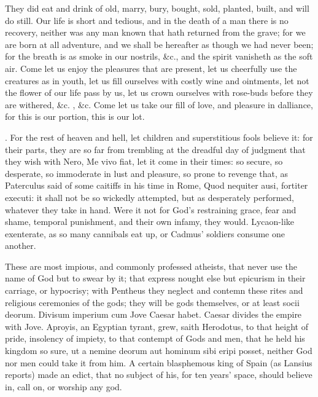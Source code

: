 {They did eat and drink of old, marry, bury, bought, sold,
planted, built, and will do still. Our life is short and tedious,
and in the death of a man there is no recovery, neither was any man
known that hath returned from the grave; for we are born at all
adventure, and we shall be hereafter as though we had never been; for
the breath is as smoke in our nostrils, \&c., and the spirit vanisheth
as the soft air. Come let us enjoy the pleasures that are
present, let us cheerfully use the creatures as in youth, let us fill
ourselves with costly wine and ointments, let not the flower of our
life pass by us, let us crown ourselves with rose-buds before they are
withered, \&c. , \&c.  Come let
us take our fill of love, and pleasure in dalliance, for this is our
portion, this is our lot.

. For the rest of
heaven and hell, let children and superstitious fools believe it: for
their parts, they are so far from trembling at the dreadful day of
judgment that they wish with Nero, Me vivo fiat, let it come in their
times: so secure, so desperate, so immoderate in lust and pleasure, so
prone to revenge that, as Paterculus said of some caitiffs in his time
in Rome, Quod nequiter ausi, fortiter executi: it shall not be so
wickedly attempted, but as desperately performed, whatever they take in
hand. Were it not for God's restraining grace, fear and shame, temporal
punishment, and their own infamy, they would. Lycaon-like exenterate,
as so many cannibals eat up, or Cadmus' soldiers consume one another.

These are most impious, and commonly professed atheists, that never use
the name of God but to swear by it; that express nought else but
epicurism in their carriage, or hypocrisy; with Pentheus they neglect
and contemn these rites and religious ceremonies of the gods; they will
be gods themselves, or at least socii deorum. Divisum imperium cum Jove
Caesar habet. Caesar divides the empire with Jove. Aproyis, an Egyptian
tyrant, grew, saith Herodotus, to that height of pride, insolency
of impiety, to that contempt of Gods and men, that he held his kingdom
so sure, ut a nemine deorum aut hominum sibi eripi posset, neither God
nor men could take it from him. A certain blasphemous king of
Spain (as Lansius reports) made an edict, that no subject of his,
for ten years' space, should believe in, call on, or worship any god.

}
